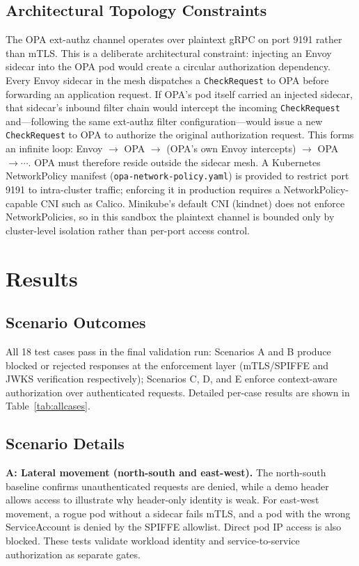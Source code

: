 \documentclass[conference]{IEEEtran}
\begin{document}
\subsection{Architectural Topology Constraints}
\label{sec:topo}
The OPA ext-authz channel operates over plaintext gRPC on port 9191 rather than mTLS.
This is a deliberate architectural constraint: injecting an Envoy sidecar into the OPA pod
would create a circular authorization dependency. Every Envoy sidecar in the mesh dispatches
a \texttt{CheckRequest} to OPA before forwarding an application request. If OPA's pod itself
carried an injected sidecar, that sidecar's inbound filter chain would intercept the incoming
\texttt{CheckRequest} and---following the same ext-authz filter configuration---would issue a
new \texttt{CheckRequest} to OPA to authorize the original authorization request. This forms
an infinite loop: Envoy $\to$ OPA $\to$ (OPA's own Envoy intercepts) $\to$ OPA $\to \cdots$.
OPA must therefore reside outside the sidecar mesh. A Kubernetes NetworkPolicy manifest
(\texttt{opa-network-policy.yaml}) is provided to restrict port 9191 to intra-cluster
traffic; enforcing it in production requires a NetworkPolicy-capable CNI such as Calico.
Minikube's default CNI (kindnet) does not enforce NetworkPolicies, so in this sandbox
the plaintext channel is bounded only by cluster-level isolation rather than
per-port access control.

\vspace{4pt}
\section{Results}
\subsection{Scenario Outcomes}
All 18 test cases pass in the final validation run: Scenarios A and B produce blocked or
rejected responses at the enforcement layer (mTLS/SPIFFE and JWKS verification respectively);
Scenarios C, D, and E enforce context-aware authorization over authenticated requests.
Detailed per-case results are shown in Table~\ref{tab:allcases}.

\subsection{Scenario Details}
\textbf{A: Lateral movement (north-south and east-west).} The north-south baseline
confirms unauthenticated requests are denied, while a demo header allows access to
illustrate why header-only identity is weak. For east-west movement, a rogue pod
without a sidecar fails mTLS, and a pod with the wrong ServiceAccount is denied by the
SPIFFE allowlist. Direct pod IP access is also blocked. These tests validate workload
identity and service-to-service authorization as separate gates.
\end{document}
